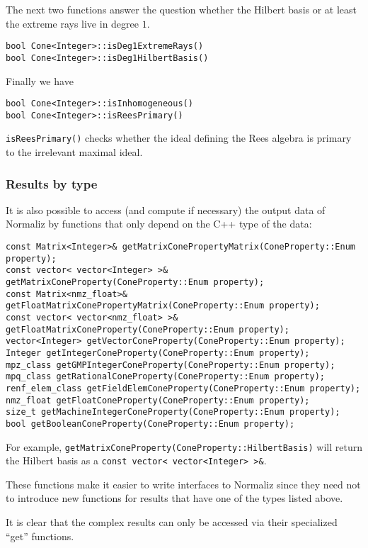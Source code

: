 \begin{small}
The next two functions answer the question whether the Hilbert basis or at least the extreme rays live in degree $1$.
\begin{Verbatim}
bool Cone<Integer>::isDeg1ExtremeRays()
bool Cone<Integer>::isDeg1HilbertBasis()
\end{Verbatim}

Finally we have
\begin{Verbatim}
bool Cone<Integer>::isInhomogeneous()
bool Cone<Integer>::isReesPrimary()
\end{Verbatim}
\verb|isReesPrimary()| checks whether the ideal defining the Rees algebra is primary to the irrelevant maximal ideal.


\subsubsection{Results by type}\label{ByType}

It is also possible to access (and compute if necessary) the output data of Normaliz by functions that only depend on the C++ type of the data:

\begin{Verbatim}
const Matrix<Integer>& getMatrixConePropertyMatrix(ConeProperty::Enum property);
const vector< vector<Integer> >& getMatrixConeProperty(ConeProperty::Enum property);
const Matrix<nmz_float>& getFloatMatrixConePropertyMatrix(ConeProperty::Enum property);
const vector< vector<nmz_float> >& getFloatMatrixConeProperty(ConeProperty::Enum property);
vector<Integer> getVectorConeProperty(ConeProperty::Enum property);
Integer getIntegerConeProperty(ConeProperty::Enum property);
mpz_class getGMPIntegerConeProperty(ConeProperty::Enum property);
mpq_class getRationalConeProperty(ConeProperty::Enum property);
renf_elem_class getFieldElemConeProperty(ConeProperty::Enum property);
nmz_float getFloatConeProperty(ConeProperty::Enum property);
size_t getMachineIntegerConeProperty(ConeProperty::Enum property);
bool getBooleanConeProperty(ConeProperty::Enum property);
\end{Verbatim}

For example, \verb|getMatrixConeProperty(ConeProperty::HilbertBasis)| will return the Hilbert basis as a \verb|const vector< vector<Integer> >&|.

These functions make it easier to write interfaces to Normaliz since they need not to introduce new functions for results that have one of the types listed above.

It is clear that the complex results can only be accessed via their specialized ``get'' functions.


\end{small}
